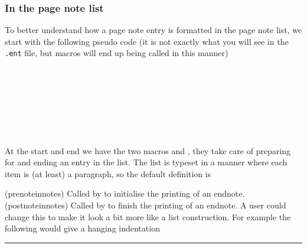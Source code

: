 \subsubsection{In the page note list}
\label{sec:page-note-list}

  

To better understand how a page note entry is formatted in the page
note list, we start with the following  pseudo code (it is not exactly
what you will see in the \texttt{.ent} file, but macros will end up
being called in this manner)
\begin{syntax}
\cmd{\prenoteinnotes}\\
\cmd{\noteidinnotes}\\
\cmd{\pageinnotes}\\
\cmd{\prenotetext}\\
\quad{}\\
\cmd{\postnotetext}\\
\cmd{\postnoteinnotes}
\end{syntax}
At the start and end we have the two macros \cmd{\prenoteinnotes} and
\cmd{\postnoteinnotes}, they take care of preparing for and ending an
entry in the list. The list is typeset in a manner where each item is
(at least) a paragraph, so the default definition is
\begin{lcode}
\newcommand{\prenoteinnotes}{\par\noindent}
\newcommand{\postnoteinnotes}{\par}
\end{lcode}
\glossary(prenoteinnotes)%
  {}%
  {Called by  to initialise the printing of an endnote.}%
\glossary(postnoteinnotes)%
  {}%
  {Called by  to finish the printing of an endnote.}%
A user could change this to make it look a bit more like a list
construction. For example the following would give a hanging
indentation
\begin{lcode}
\renewcommand{\prenoteinnotes}{\par\noindent\hangindent 2em}
\end{lcode}

\fancybreak{}


